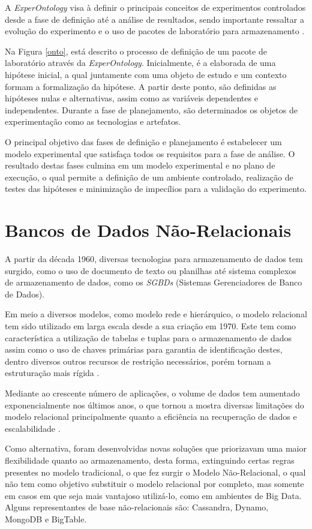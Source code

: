 A \textit{ExperOntology} visa à definir o principais conceitos de experimentos controlados desde a fase de definição até a análise de resultados, sendo importante ressaltar a evolução do experimento e o uso de pacotes de laboratório para armazenamento \cite{Garcia08}. 

Na Figura \ref{onto}, está descrito o processo de definição de um pacote de laboratório através da \textit{ExperOntology}. Inicialmente, é a elaborada de uma hipótese inicial, a qual juntamente com uma objeto de estudo e um contexto formam a formalização da hipótese. A partir deste ponto, são definidas as hipóteses nulas e alternativas, assim como as variáveis dependentes e independentes. Durante a fase de planejamento, são determinados os objetos de experimentação como as tecnologias e artefatos.

O principal objetivo das fases de definição e planejamento é estabelecer um modelo experimental que satisfaça todos os requisitos para a fase de análise. O resultado destas fases culmina em um modelo experimental e no plano de execução, o qual permite a definição de um ambiente controlado, realização de testes das hipóteses e minimização de impecílios para a validação do experimento.

\section{Bancos de Dados Não-Relacionais}
A partir da década 1960, diversas tecnologias para armazenamento de dados tem surgido, como o uso de documento de texto ou planilhas até sistema complexos de armazenamento de dados, como os \textit{SGBDs} (Sistemas Gerenciadores de Banco de Dados). 

Em meio a diversos modelos, como modelo rede e hierárquico, o modelo relacional tem sido utilizado em larga escala desde a sua criação em 1970. Este tem como característica a utilização de tabelas e tuplas para o armazenamento de dados assim como o uso de chaves primárias para garantia de identificação destes, dentro diversos outros recursos de restrição necessários, porém tornam a estruturação mais rígida \cite{brito2010bancos}.

Mediante ao crescente número de aplicações, o volume de dados tem aumentado exponencialmente nos últimos anos, o que tornou a mostra diversas limitações do modelo relacional principalmente quanto a eficiência na recuperação de dados e escalabilidade \cite{toth2011abordagem}.

Como alternativa, foram desenvolvidas novas soluções que priorizavam uma maior flexibilidade quanto ao armazenamento, desta forma, extinguindo certas regras presentes no modelo tradicional, o que fez surgir o Modelo Não-Relacional, o qual não tem como objetivo substituir o modelo relacional por completo, mas somente em casos em que seja mais vantajoso utilizá-lo, como em ambientes de Big Data. Alguns representantes de base não-relacionais são: Cassandra, Dynamo, MongoDB e BigTable.

